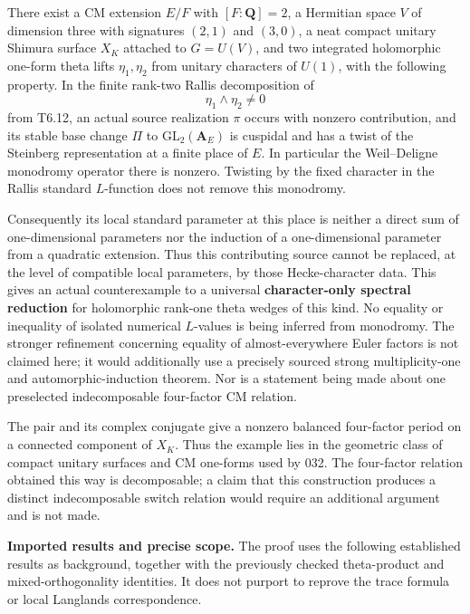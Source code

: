 \documentclass[11pt,a4paper]{article}
\theoremstyle{definition}
\begin{document}
There exist a CM extension \(E/F\) with \([F:\mathbf Q]=2\), a Hermitian space \(V\) of dimension three with signatures \((2,1)\) and \((3,0)\), a neat compact unitary Shimura surface \(X_K\) attached to \(G=U(V)\), and two integrated holomorphic one-form theta lifts \(\eta_1,\eta_2\) from unitary characters of \(U(1)\), with the following property. In the finite rank-two Rallis decomposition of \[
\eta_1\wedge\eta_2\ne0
\] from T6.12, an actual source realization \(\pi\) occurs with nonzero contribution, and its stable base change \(\Pi\) to \(\mathrm{GL}_2(\mathbf A_E)\) is cuspidal and has a twist of the Steinberg representation at a finite place of \(E\). In particular the Weil--Deligne monodromy operator there is nonzero. Twisting by the fixed character in the Rallis standard \(L\)-function does not remove this monodromy.

Consequently its local standard parameter at this place is neither a direct sum of one-dimensional parameters nor the induction of a one-dimensional parameter from a quadratic extension. Thus this contributing source cannot be replaced, at the level of compatible local parameters, by those Hecke-character data. This gives an actual counterexample to a universal \textbf{character-only spectral reduction} for holomorphic rank-one theta wedges of this kind. No equality or inequality of isolated numerical \(L\)-values is being inferred from monodromy. The stronger refinement concerning equality of almost-everywhere Euler factors is not claimed here; it would additionally use a precisely sourced strong multiplicity-one and automorphic-induction theorem. Nor is a statement being made about one preselected indecomposable four-factor CM relation.

The pair and its complex conjugate give a nonzero balanced four-factor period on a connected component of \(X_K\). Thus the example lies in the geometric class of compact unitary surfaces and CM one-forms used by 032. The four-factor relation obtained this way is decomposable; a claim that this construction produces a distinct indecomposable switch relation would require an additional argument and is not made.

\textbf{Imported results and precise scope.} The proof uses the following established results as background, together with the previously checked theta-product and mixed-orthogonality identities. It does not purport to reprove the trace formula or local Langlands correspondence.
\end{document}
